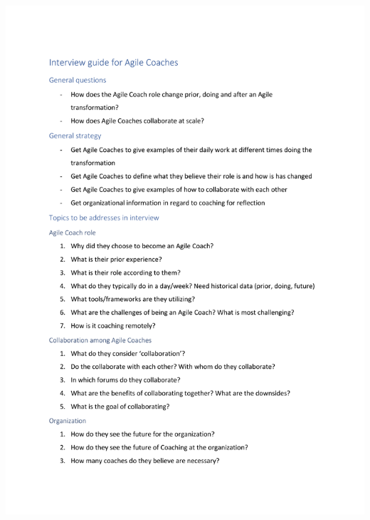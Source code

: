 \documentclass[11pt,a4paper]{report}
\begin{document}
\includegraphics[scale=1, page=2]{InterviewTemplates/acInterview.pdf}

\restoregeometry
\end{document}
